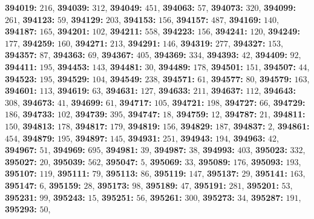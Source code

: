 \textsf{\bfseries 394019:} $216$, \textsf{\bfseries 394039:} $312$, \textsf{\bfseries 394049:} $451$, \textsf{\bfseries 394063:} $57$, \textsf{\bfseries 394073:} $320$, \textsf{\bfseries 394099:} $261$, \textsf{\bfseries 394123:} $59$, \textsf{\bfseries 394129:} $203$, \textsf{\bfseries 394153:} $156$, \textsf{\bfseries 394157:} $487$, \textsf{\bfseries 394169:} $140$, \textsf{\bfseries 394187:} $165$, \textsf{\bfseries 394201:} $102$, \textsf{\bfseries 394211:} $558$, \textsf{\bfseries 394223:} $156$, \textsf{\bfseries 394241:} $120$, \textsf{\bfseries 394249:} $177$, \textsf{\bfseries 394259:} $160$, \textsf{\bfseries 394271:} $213$, \textsf{\bfseries 394291:} $146$, \textsf{\bfseries 394319:} $277$, \textsf{\bfseries 394327:} $153$, \textsf{\bfseries 394357:} $87$, \textsf{\bfseries 394363:} $69$, \textsf{\bfseries 394367:} $405$, \textsf{\bfseries 394369:} $334$, \textsf{\bfseries 394393:} $42$, \textsf{\bfseries 394409:} $92$, \textsf{\bfseries 394411:} $195$, \textsf{\bfseries 394453:} $143$, \textsf{\bfseries 394481:} $30$, \textsf{\bfseries 394489:} $178$, \textsf{\bfseries 394501:} $151$, \textsf{\bfseries 394507:} $44$, \textsf{\bfseries 394523:} $195$, \textsf{\bfseries 394529:} $104$, \textsf{\bfseries 394549:} $238$, \textsf{\bfseries 394571:} $61$, \textsf{\bfseries 394577:} $80$, \textsf{\bfseries 394579:} $163$, \textsf{\bfseries 394601:} $113$, \textsf{\bfseries 394619:} $63$, \textsf{\bfseries 394631:} $127$, \textsf{\bfseries 394633:} $211$, \textsf{\bfseries 394637:} $112$, \textsf{\bfseries 394643:} $308$, \textsf{\bfseries 394673:} $41$, \textsf{\bfseries 394699:} $61$, \textsf{\bfseries 394717:} $105$, \textsf{\bfseries 394721:} $198$, \textsf{\bfseries 394727:} $66$, \textsf{\bfseries 394729:} $186$, \textsf{\bfseries 394733:} $102$, \textsf{\bfseries 394739:} $395$, \textsf{\bfseries 394747:} $18$, \textsf{\bfseries 394759:} $12$, \textsf{\bfseries 394787:} $21$, \textsf{\bfseries 394811:} $150$, \textsf{\bfseries 394813:} $178$, \textsf{\bfseries 394817:} $179$, \textsf{\bfseries 394819:} $156$, \textsf{\bfseries 394829:} $187$, \textsf{\bfseries 394837:} $2$, \textsf{\bfseries 394861:} $454$, \textsf{\bfseries 394879:} $195$, \textsf{\bfseries 394897:} $145$, \textsf{\bfseries 394931:} $251$, \textsf{\bfseries 394943:} $194$, \textsf{\bfseries 394963:} $42$, \textsf{\bfseries 394967:} $51$, \textsf{\bfseries 394969:} $695$, \textsf{\bfseries 394981:} $39$, \textsf{\bfseries 394987:} $38$, \textsf{\bfseries 394993:} $403$, \textsf{\bfseries 395023:} $332$, \textsf{\bfseries 395027:} $20$, \textsf{\bfseries 395039:} $562$, \textsf{\bfseries 395047:} $5$, \textsf{\bfseries 395069:} $33$, \textsf{\bfseries 395089:} $176$, \textsf{\bfseries 395093:} $193$, \textsf{\bfseries 395107:} $119$, \textsf{\bfseries 395111:} $79$, \textsf{\bfseries 395113:} $86$, \textsf{\bfseries 395119:} $147$, \textsf{\bfseries 395137:} $29$, \textsf{\bfseries 395141:} $163$, \textsf{\bfseries 395147:} $6$, \textsf{\bfseries 395159:} $28$, \textsf{\bfseries 395173:} $98$, \textsf{\bfseries 395189:} $47$, \textsf{\bfseries 395191:} $281$, \textsf{\bfseries 395201:} $53$, \textsf{\bfseries 395231:} $99$, \textsf{\bfseries 395243:} $15$, \textsf{\bfseries 395251:} $56$, \textsf{\bfseries 395261:} $300$, \textsf{\bfseries 395273:} $34$, \textsf{\bfseries 395287:} $191$, \textsf{\bfseries 395293:} $50$, 
